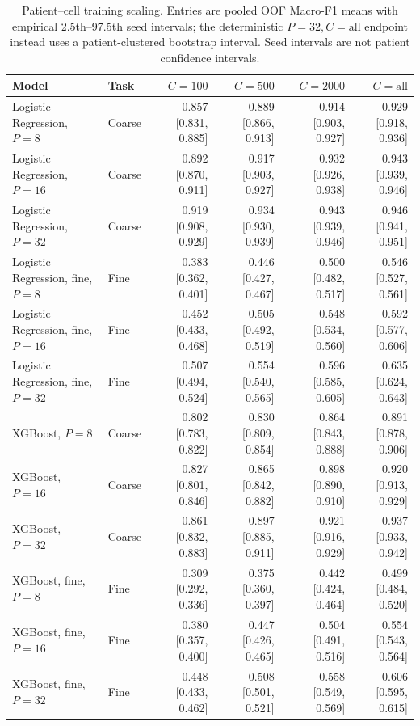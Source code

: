 \begin{table}[t]
\centering
\small
\begin{tabular}{llrrrr}
\toprule
Model & Task & $C=100$ & $C=500$ & $C=2000$ & $C=\mathrm{all}$ \\
\midrule
Logistic Regression, $P=8$ & Coarse & 0.857 [0.831, 0.885] & 0.889 [0.866, 0.913] & 0.914 [0.903, 0.927] & 0.929 [0.918, 0.936] \\
Logistic Regression, $P=16$ & Coarse & 0.892 [0.870, 0.911] & 0.917 [0.903, 0.927] & 0.932 [0.926, 0.938] & 0.943 [0.939, 0.946] \\
Logistic Regression, $P=32$ & Coarse & 0.919 [0.908, 0.929] & 0.934 [0.930, 0.939] & 0.943 [0.939, 0.946] & 0.946 [0.941, 0.951] \\
Logistic Regression, fine, $P=8$ & Fine & 0.383 [0.362, 0.401] & 0.446 [0.427, 0.467] & 0.500 [0.482, 0.517] & 0.546 [0.527, 0.561] \\
Logistic Regression, fine, $P=16$ & Fine & 0.452 [0.433, 0.468] & 0.505 [0.492, 0.519] & 0.548 [0.534, 0.560] & 0.592 [0.577, 0.606] \\
Logistic Regression, fine, $P=32$ & Fine & 0.507 [0.494, 0.524] & 0.554 [0.540, 0.565] & 0.596 [0.585, 0.605] & 0.635 [0.624, 0.643] \\
\midrule
XGBoost, $P=8$ & Coarse & 0.802 [0.783, 0.822] & 0.830 [0.809, 0.854] & 0.864 [0.843, 0.888] & 0.891 [0.878, 0.906] \\
XGBoost, $P=16$ & Coarse & 0.827 [0.801, 0.846] & 0.865 [0.842, 0.882] & 0.898 [0.890, 0.910] & 0.920 [0.913, 0.929] \\
XGBoost, $P=32$ & Coarse & 0.861 [0.832, 0.883] & 0.897 [0.885, 0.911] & 0.921 [0.916, 0.929] & 0.937 [0.933, 0.942] \\
XGBoost, fine, $P=8$ & Fine & 0.309 [0.292, 0.336] & 0.375 [0.360, 0.397] & 0.442 [0.424, 0.464] & 0.499 [0.484, 0.520] \\
XGBoost, fine, $P=16$ & Fine & 0.380 [0.357, 0.400] & 0.447 [0.426, 0.465] & 0.504 [0.491, 0.516] & 0.554 [0.543, 0.564] \\
XGBoost, fine, $P=32$ & Fine & 0.448 [0.433, 0.462] & 0.508 [0.501, 0.521] & 0.558 [0.549, 0.569] & 0.606 [0.595, 0.615] \\
\midrule
\bottomrule
\end{tabular}
\caption{Patient--cell training scaling. Entries are pooled OOF Macro-F1 means with empirical 2.5th--97.5th seed intervals; the deterministic $P=32,C=\mathrm{all}$ endpoint instead uses a patient-clustered bootstrap interval. Seed intervals are not patient confidence intervals.}
\label{tab:patient_cell_scaling}
\end{table}
